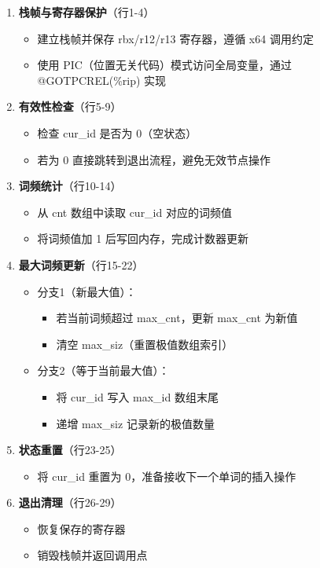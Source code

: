 \documentclass[10pt,a4paper]{article}
\begin{document}
\begin{enumerate}
    \item \textbf{栈帧与寄存器保护}（行1-4）
    \begin{itemize}
        \item 建立栈帧并保存 rbx/r12/r13 寄存器，遵循 x64 调用约定
        \item 使用 PIC（位置无关代码）模式访问全局变量，通过 @GOTPCREL(\%rip) 实现
    \end{itemize}
    
    \item \textbf{有效性检查}（行5-9）
    \begin{itemize}
        \item 检查 cur\_id 是否为 0（空状态）
        \item 若为 0 直接跳转到退出流程，避免无效节点操作
    \end{itemize}
    
    \item \textbf{词频统计}（行10-14）
    \begin{itemize}
        \item 从 cnt 数组中读取 cur\_id 对应的词频值
        \item 将词频值加 1 后写回内存，完成计数器更新
    \end{itemize}
    
    \item \textbf{最大词频更新}（行15-22）
    \begin{itemize}
        \item 分支1（新最大值）：
        \begin{itemize}
            \item 若当前词频超过 max\_cnt，更新 max\_cnt 为新值
            \item 清空 max\_siz（重置极值数组索引）
        \end{itemize}
        \item 分支2（等于当前最大值）：
        \begin{itemize}
            \item 将 cur\_id 写入 max\_id 数组末尾
            \item 递增 max\_siz 记录新的极值数量
        \end{itemize}
    \end{itemize}
    
    \item \textbf{状态重置}（行23-25）
    \begin{itemize}
        \item 将 cur\_id 重置为 0，准备接收下一个单词的插入操作
    \end{itemize}
    
    \item \textbf{退出清理}（行26-29）
    \begin{itemize}
        \item 恢复保存的寄存器
        \item 销毁栈帧并返回调用点
    \end{itemize}
\end{enumerate}
\end{document}
